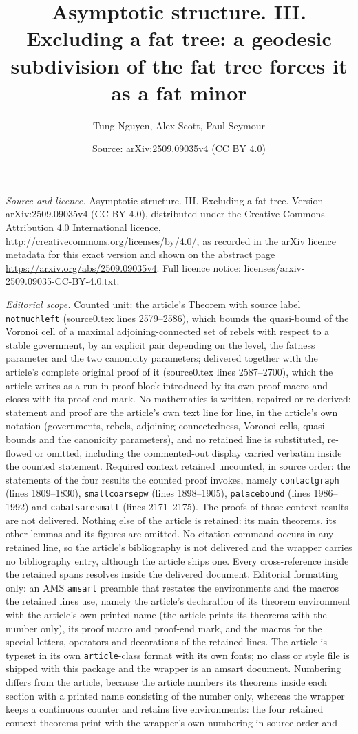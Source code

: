 \documentclass[10pt,a4paper]{amsart}
\title[Excluding a fat tree]{Asymptotic structure. III. Excluding a fat tree: a geodesic subdivision of the fat tree forces it as a fat minor}
\author{Tung Nguyen, Alex Scott, Paul Seymour}
\date{Source: arXiv:2509.09035v4 (CC BY 4.0)}
\theoremstyle{plain}
\begin{document}
\maketitle
\noindent\emph{Source and licence.} Asymptotic structure. III. Excluding a fat tree. Version arXiv:2509.09035v4 (CC BY 4.0), distributed under the Creative Commons Attribution 4.0 International licence, \url{http://creativecommons.org/licenses/by/4.0/}, as recorded in the arXiv licence metadata for this exact version and shown on the abstract page \url{https://arxiv.org/abs/2509.09035v4}. Full licence notice: licenses/arxiv-2509.09035-CC-BY-4.0.txt.\par\smallskip

\noindent\textit{Editorial scope.} Counted unit: the article's Theorem with source label \texttt{notmuchleft} (source0.tex lines 2579--2586), which bounds the quasi-bound of the Voronoi cell of a maximal adjoining-connected set of rebels with respect to a stable government, by an explicit pair depending on the level, the fatness parameter and the two canonicity parameters; delivered together with the article's complete original proof of it (source0.tex lines 2587--2700), which the article writes as a run-in proof block introduced by its own proof macro and closes with its proof-end mark. No mathematics is written, repaired or re-derived: statement and proof are the article's own text line for line, in the article's own notation (governments, rebels, adjoining-connectedness, Voronoi cells, quasi-bounds and the canonicity parameters), and no retained line is substituted, re-flowed or omitted, including the commented-out display carried verbatim inside the counted statement. Required context retained uncounted, in source order: the statements of the four results the counted proof invokes, namely \texttt{contactgraph} (lines 1809--1830), \texttt{smallcoarsepw} (lines 1898--1905), \texttt{palacebound} (lines 1986--1992) and \texttt{cabalsaresmall} (lines 2171--2175). The proofs of those context results are not delivered. Nothing else of the article is retained: its main theorems, its other lemmas and its figures are omitted. No citation command occurs in any retained line, so the article's bibliography is not delivered and the wrapper carries no bibliography entry, although the article ships one. Every cross-reference inside the retained spans resolves inside the delivered document. Editorial formatting only: an AMS \texttt{amsart} preamble that restates the environments and the macros the retained lines use, namely the article's declaration of its theorem environment with the article's own printed name (the article prints its theorems with the number only), its proof macro and proof-end mark, and the macros for the special letters, operators and decorations of the retained lines. The article is typeset in its own \texttt{article}-class format with its own fonts; no class or style file is shipped with this package and the wrapper is an amsart document. Numbering differs from the article, because the article numbers its theorems inside each section with a printed name consisting of the number only, whereas the wrapper keeps a continuous counter and retains five environments: the four retained context theorems print with the wrapper's own numbering in source order and 
\end{document}
